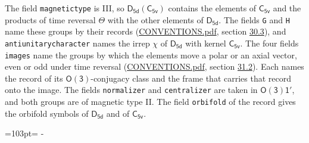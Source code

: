 \documentclass[10pt,a4paper]{article}
\newcommand{\needspace}[1]{\par\penalty-100\begingroup\dimen0=#1\relax\dimen2=\pagegoal
  \advance\dimen2-\pagetotal\ifdim\dimen0>\dimen2\relax\ifdim\dimen2>0pt\vfil\break\fi\fi
  \endgroup}
\numberwithin{equation}{section}
\newcommand{\grp}[1]{\mathsf{#1}}
\begin{document}
The field \texttt{magnetictype} is III, so $\grp{D_{5d}}(\grp{C_{5v}})$ contains the elements of $\grp{C_{5v}}$ and the products of time reversal $\varTheta$ with the other elements of $\grp{D_{5d}}$. The fields \texttt{G} and \texttt{H} name these groups by their records (\href{../../CONVENTIONS.pdf}{CONVENTIONS.pdf}, section \href{../../CONVENTIONS.pdf\#conv.30.3}{30.3}), and \texttt{antiunitarycharacter} names the irrep $\chi$ of $\grp{D_{5d}}$ with kernel $\grp{C_{5v}}$. The four fields \texttt{images} name the groups by which the elements move a polar or an axial vector, even or odd under time reversal (\href{../../CONVENTIONS.pdf}{CONVENTIONS.pdf}, section \href{../../CONVENTIONS.pdf\#conv.31.2}{31.2}). Each names the record of its $\grp{O(3)}$-conjugacy class and the frame that carries that record onto the image. The fields \texttt{normalizer} and \texttt{centralizer} are taken in $\grp{O(3)1'}$, and both groups are of magnetic type II. The field \texttt{orbifold} of the record gives the orbifold symbols of $\grp{D_{5d}}$ and of $\grp{C_{5v}}$.
\needspace{103pt}
\end{document}
